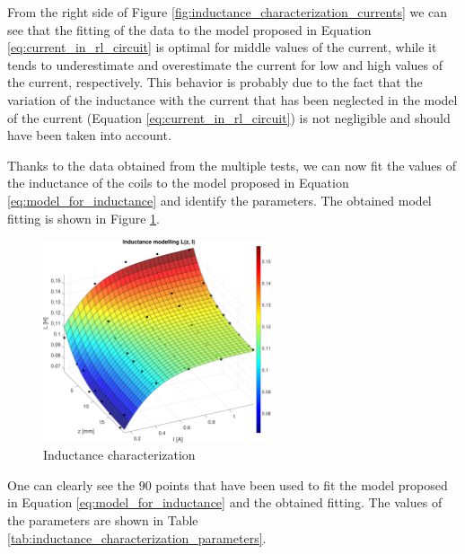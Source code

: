 From the right side of Figure \ref{fig:inductance_characterization_currents} we can see that the fitting of the data to the model proposed in Equation \ref{eq:current_in_rl_circuit} is optimal for middle values of the current, while it tends to underestimate and overestimate the current for low and high values of the current, respectively.
This behavior is probably due to the fact that the variation of the inductance with the current that has been neglected in the model of the current (Equation \ref{eq:current_in_rl_circuit}) is not negligible and should have been taken into account.

Thanks to the data obtained from the multiple tests, we can now fit the values of the inductance of the coils to the model proposed in Equation \ref{eq:model_for_inductance} and identify the parameters.
The obtained model fitting is shown in Figure \ref{fig:inductance_characterization_inductance}.

\begin{figure}[H]
    \centering
    \includegraphics[width=0.6\textwidth]{img/MATLAB/identification/inductance.pdf}
    \caption{Inductance characterization}
    \label{fig:inductance_characterization_inductance}
\end{figure}

One can clearly see the $90$ points that have been used to fit the model proposed in Equation \ref{eq:model_for_inductance} and the obtained fitting.
The values of the parameters are shown in Table \ref{tab:inductance_characterization_parameters}.

